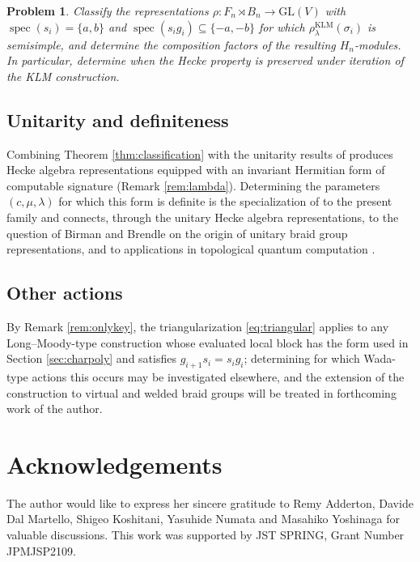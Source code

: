 \documentclass[11pt]{article}
\newtheorem{problem}[theorem]{Problem}
\theoremstyle{definition}
\theoremstyle{remark}
\newcommand{\GL}{\mathrm{GL}}
\newcommand{\spec}{\operatorname{spec}}
\newcommand{\rKLM}{\rho^{\mathrm{KLM}}_{\lambda}}
\begin{document}
\begin{problem}
Classify the representations $\rho \colon F_n \rtimes B_n \to \GL(V)$
with $\spec(s_i) = \{a,b\}$ and $\spec(s_i g_i) \subseteq \{-a,-b\}$ for
which $\rKLM(\sigma_i)$ is semisimple, and determine the composition
factors of the resulting $H_n$-modules. In particular, determine when the
Hecke property is preserved under iteration of the KLM construction.
\end{problem}

\subsection*{Unitarity and definiteness}
Combining Theorem \ref{thm:classification} with the unitarity results of
\cite{Negami25} produces Hecke algebra representations equipped with an
invariant Hermitian form of computable signature (Remark
\ref{rem:lambda}). Determining the parameters $(c, \mu, \lambda)$ for
which this form is definite is the specialization of
\cite[Problem 18]{Negami25} to the present family and connects, through
the unitary Hecke algebra representations, to the question of Birman and
Brendle \cite{BirmanBrendle05} on the origin of unitary braid group
representations, and to applications in topological quantum computation
\cite{NSSFD08, DRW16}.

\subsection*{Other actions}
By Remark \ref{rem:onlykey}, the triangularization \eqref{eq:triangular}
applies to any Long--Moody-type construction whose evaluated local
block has the form used in Section \ref{sec:charpoly} and satisfies
$g_{i+1} s_i = s_i g_i$; determining for which Wada-type actions
\cite{Wada92, Ito13, Soulie19} this occurs may be investigated
elsewhere, and the extension of the construction to virtual and welded
braid groups will be treated in forthcoming work of the author.

\section*{Acknowledgements}
The author would like to express her sincere gratitude to
Remy Adderton, Davide Dal Martello, Shigeo Koshitani, Yasuhide Numata and
Masahiko Yoshinaga for valuable discussions.
This work was supported by JST SPRING, Grant Number JPMJSP2109.
\end{document}
